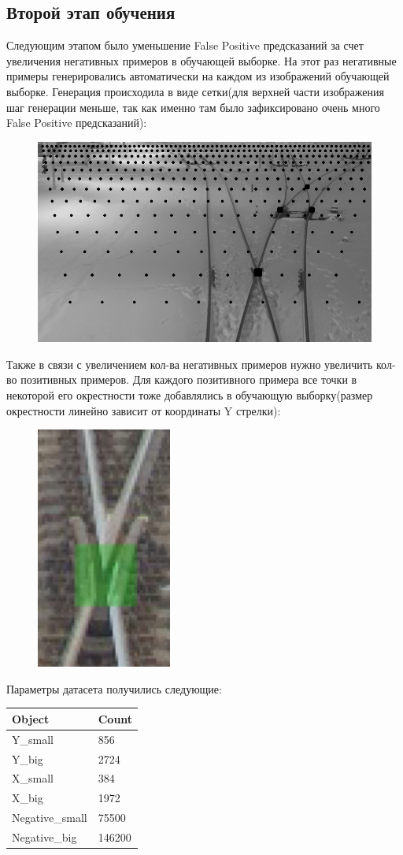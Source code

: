 \subsection{Второй этап обучения}
Следующим этапом было уменьшение False Positive предсказаний за счет увеличения негативных примеров в обучающей выборке. На этот раз негативные примеры генерировались автоматически на каждом из изображений обучающей выборке. Генерация происходила в виде сетки(для верхней части изображения шаг генерации меньше, так как именно там было зафиксировано очень много False Positive предсказаний):
\begin{figure}[h!]
	\centering
	\includegraphics[width=0.7\linewidth]{pictures/grid_negative.png}
	\caption{}
	\label{fig:screenshot32}
\end{figure}
\newline
Также в связи с увеличением кол-ва негативных примеров нужно увеличить кол-во позитивных примеров. Для каждого позитивного примера все точки в некоторой его окрестности тоже добавлялись в обучающую выборку(размер окрестности линейно зависит от координаты Y стрелки):
\begin{figure}[!h]
	\centering
	\includegraphics[width=0.1\linewidth]{pictures/screenshot2323}
	\caption{}
	\label{fig:screenshot2323}
\end{figure}
\newpage
Параметры датасета получились следующие:
\begin{table}[!h]
	\begin{tabular}{|l|l|}
		\hline
		\textbf{Object} & \textbf{Count} \\ \hline
		Y\_small        & 856            \\ \hline
		Y\_big          & 2724           \\ \hline
		X\_small        & 384            \\ \hline
		X\_big          & 1972           \\ \hline
		Negative\_small & 75500          \\ \hline
		Negative\_big   & 146200         \\ \hline
	\end{tabular}
\end{table}

